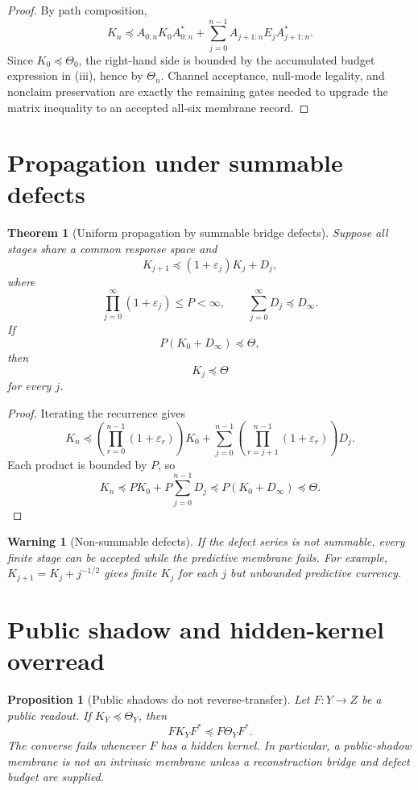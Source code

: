 \documentclass[11pt]{article}
\newtheorem{theorem}{Theorem}
\newtheorem{proposition}{Proposition}
\newtheorem{warning}{Warning}
\begin{document}
\begin{proof}
By path composition,
\[
K_n\preceq A_{0:n}K_0A_{0:n}^*+
\sum_{j=0}^{n-1}A_{j+1:n}E_jA_{j+1:n}^*.
\]
Since $K_0\preceq\Theta_0$, the right-hand side is bounded by the accumulated budget expression in (iii), hence by $\Theta_n$. Channel acceptance, null-mode legality, and nonclaim preservation are exactly the remaining gates needed to upgrade the matrix inequality to an accepted all-six membrane record.
\end{proof}

\section{Propagation under summable defects}

\begin{theorem}[Uniform propagation by summable bridge defects]
Suppose all stages share a common response space and
\[
K_{j+1}\preceq (1+\varepsilon_j)K_j+D_j,
\]
where
\[
\prod_{j=0}^{\infty}(1+\varepsilon_j)\le P<\infty,
\qquad
\sum_{j=0}^{\infty}D_j\preceq D_\infty.
\]
If
\[
P(K_0+D_\infty)\preceq\Theta,
\]
then
\[
K_j\preceq\Theta
\]
for every $j$.
\end{theorem}

\begin{proof}
Iterating the recurrence gives
\[
K_n\preceq \left(\prod_{r=0}^{n-1}(1+\varepsilon_r)\right)K_0
+
\sum_{j=0}^{n-1}\left(\prod_{r=j+1}^{n-1}(1+\varepsilon_r)\right)D_j.
\]
Each product is bounded by $P$, so
\[
K_n\preceq P K_0+P\sum_{j=0}^{n-1}D_j\preceq P(K_0+D_\infty)\preceq\Theta.
\]
\end{proof}

\begin{warning}[Non-summable defects]
If the defect series is not summable, every finite stage can be accepted while the predictive membrane fails. For example, $K_{j+1}=K_j+j^{-1/2}$ gives finite $K_j$ for each $j$ but unbounded predictive currency.
\end{warning}

\section{Public shadow and hidden-kernel overread}

\begin{proposition}[Public shadows do not reverse-transfer]
Let $F:Y\to Z$ be a public readout. If $K_Y\preceq\Theta_Y$, then
\[
F K_Y F^*\preceq F\Theta_YF^*.
\]
The converse fails whenever $F$ has a hidden kernel. In particular, a public-shadow membrane is not an intrinsic membrane unless a reconstruction bridge and defect budget are supplied.
\end{proposition}
\end{document}
